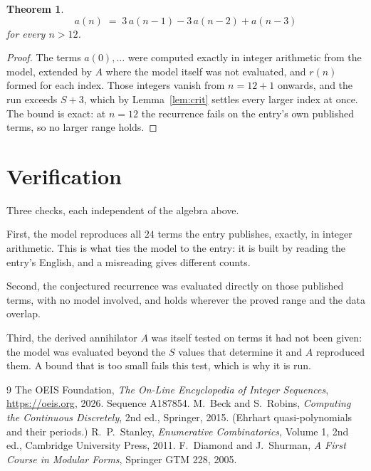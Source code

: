 \documentclass[11pt,a4paper]{article}
\theoremstyle{plain}
\newtheorem{theorem}{Theorem}
\theoremstyle{definition}
\begin{document}
\begin{theorem}
\[
a(n)\;=\;3\,a(n-1) - 3\,a(n-2) + a(n-3)
\]
for every $n>12$.
\end{theorem}

\begin{proof}
The terms $a(0),\dots$ were computed exactly in integer arithmetic from the model, extended by
$A$ where the model itself was not evaluated, and $r(n)$ formed for each index. Those integers
vanish from $n=12+1$ onwards, and the run exceeds $S+3$, which by
Lemma~\ref{lem:crit} settles every larger index at once. The bound is exact: at $n=12$ the recurrence fails on the entry's own published terms, so no larger range holds.
\end{proof}

\section{Verification}

Three checks, each independent of the algebra above.

First, the model reproduces all $24$ terms the entry publishes, exactly, in integer
arithmetic. This is what ties the model to the entry: it is built by reading the entry's
English, and a misreading gives different counts.

Second, the conjectured recurrence was evaluated directly on those published terms, with no
model involved, and holds wherever the proved range and the data overlap.

Third, the derived annihilator $A$ was itself tested on terms it had not been given: the model
was evaluated beyond the $S$ values that determine it and $A$ reproduced them. A bound that is
too small fails this test, which is why it is run.

\begin{thebibliography}{9}
 The OEIS Foundation, \emph{The On-Line Encyclopedia of Integer
Sequences}, \url{https://oeis.org}, 2026. Sequence A187854.
 M.~Beck and S.~Robins, \emph{Computing the Continuous Discretely},
2nd ed., Springer, 2015. (Ehrhart quasi-polynomials and their periods.)
 R.~P.~Stanley, \emph{Enumerative Combinatorics}, Volume 1, 2nd ed.,
Cambridge University Press, 2011.
 F.~Diamond and J.~Shurman, \emph{A First Course in Modular Forms},
Springer GTM 228, 2005.
\end{thebibliography}
\end{document}
